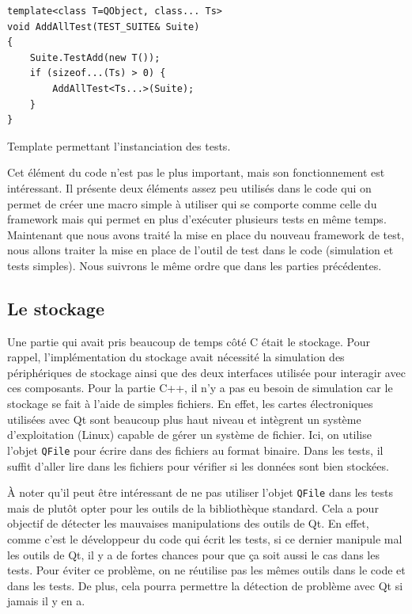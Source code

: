 \documentclass[a4paper]{article}
\begin{document}
\begin{listing}[ht!]
\begin{verbatim}
template<class T=QObject, class... Ts>
void AddAllTest(TEST_SUITE& Suite)
{
    Suite.TestAdd(new T());
    if (sizeof...(Ts) > 0) {
        AddAllTest<Ts...>(Suite);
    }
}
\end{verbatim}
\caption{Template permettant l'instanciation des tests.}
\label{lst:templateinst}
\end{listing}

Cet élément du code n'est pas le plus important, mais son fonctionnement est
intéressant. Il présente deux éléments assez peu utilisés dans le code qui on
permet de créer une macro simple à utiliser qui se comporte comme celle du
framework mais qui permet en plus d'exécuter plusieurs tests en même temps. \\

Maintenant que nous avons traité la mise en place du nouveau framework de test,
nous allons traiter la mise en place de l'outil de test dans le code (simulation
et tests simples). Nous suivrons le même ordre que dans les parties précédentes.

\subsection{Le stockage}

Une partie qui avait pris beaucoup de temps côté C était le stockage. Pour
rappel, l'implémentation du stockage avait nécessité la simulation des
périphériques de stockage ainsi que des deux interfaces utilisée pour interagir
avec ces composants. Pour la partie C++, il n'y a pas eu besoin de simulation car
le stockage se fait à l'aide de simples fichiers. En effet, les cartes
électroniques utilisées avec Qt sont beaucoup plus haut niveau et intègrent un
système d'exploitation (Linux) capable de gérer un système de fichier. Ici, on
utilise l'objet \verb|QFile| pour écrire dans des fichiers au format binaire.
Dans les tests, il suffit d'aller lire dans les fichiers pour vérifier si les données
sont bien stockées.

À noter qu'il peut être intéressant de ne pas utiliser l'objet \verb|QFile|
dans les tests mais de plutôt opter pour les outils de la bibliothèque
standard. Cela a pour objectif de détecter les mauvaises manipulations des
outils de Qt. En effet, comme c'est le développeur du code qui écrit les tests,
si ce dernier manipule mal les outils de Qt, il y a de fortes chances pour que ça
soit aussi le cas dans les tests. Pour éviter ce problème, on ne réutilise pas
les mêmes outils dans le code et dans les tests. De plus, cela pourra permettre
la détection de problème avec Qt si jamais il y en a.\\
\end{document}
